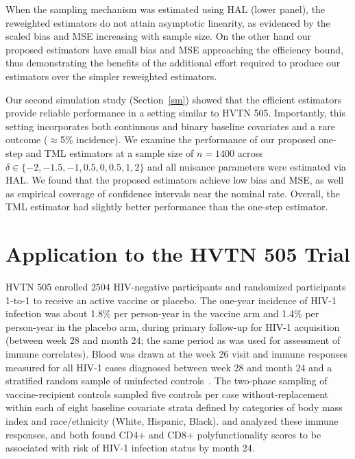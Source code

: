 When the sampling mechanism was estimated using HAL (lower panel), the
reweighted estimators do not attain asymptotic linearity, as evidenced by the
scaled bias and MSE increasing with sample size. On the other hand our proposed
estimators have small bias and MSE approaching the efficiency bound, thus
demonstrating the benefits of the additional effort required to produce our
estimators over the simpler reweighted estimators.

Our second simulation study (Section~\ref{sm}) showed that the
efficient estimators provide reliable performance in a setting similar to HVTN
505. Importantly, this setting incorporates both continuous and binary baseline
covariates and a rare outcome ($\approx$5\% incidence). We examine the
performance of our proposed one-step and TML estimators at a sample size of $n
= 1400$ across $\delta \in \{-2, -1.5, -1, 0.5, 0, 0.5, 1, 2\}$ and all nuisance
parameters were estimated via HAL. We found that the proposed estimators achieve
low bias and MSE, as well as empirical coverage of confidence intervals near the
nominal rate. Overall, the TML estimator had slightly better performance than
the one-step estimator.

\section{Application to the HVTN 505 Trial}\label{application}

HVTN 505 enrolled $2504$ HIV-negative participants and randomized participants
1-to-1 to receive an active vaccine or placebo. The one-year incidence of HIV-1
infection was about 1.8\% per person-year in the vaccine arm and 1.4\% per
person-year in the placebo arm, during primary follow-up for HIV-1 acquisition
(between week 28 and month 24; the same period as was used for assessment of
immune correlates). Blood was drawn at the week 26 visit and immune responses
measured for all HIV-1 cases diagnosed between week 28 and month 24 and
a stratified random sample of uninfected controls~\citep{janes2017higher}. The
two-phase sampling of vaccine-recipient controls sampled five controls per case
without-replacement within each of eight baseline covariate strata defined by
categories of body mass index and race/ethnicity (White, Hispanic, Black).
\citet{janes2017higher} and \citet{fong2018modification} analyzed these immune
responses, and both found CD4+ and CD8+ polyfunctionality scores to be
associated with risk of HIV-1 infection status by month 24.

